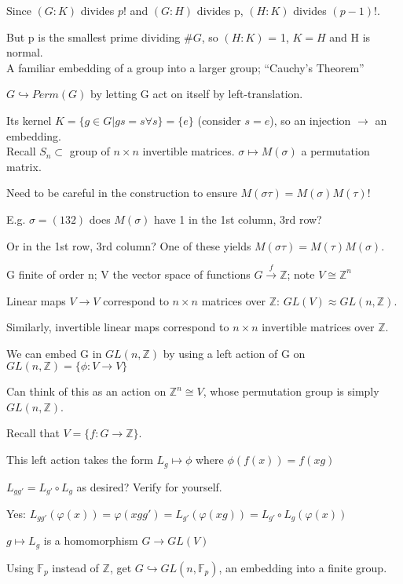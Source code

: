 \documentclass[12pt]{article}
\begin{document}
Since $(G : K)$ divides $p!$ and $(G : H)$ divides p, $(H : K)$ divides $(p - 1)!$.

But p is the smallest prime dividing $\#G$, so $(H : K)$ = 1, $K = H$ and H is normal.\\

\noindent
A familiar embedding of a group into a larger group; ``Cauchy's Theorem''

$G \hookrightarrow Perm(G)$ by letting G act on itself by left-translation.

Its kernel $K = \{g \in G | gs=s \forall s\} = \{e\}$ (consider $s = e$), so an injection $\to$ an embedding.\\

\noindent
Recall $S_n \subset$ group of $n \times n$ invertible matrices. $\sigma \mapsto M(\sigma)$ a permutation matrix.

Need to be careful in the construction to ensure $M(\sigma\tau)=M(\sigma)M(\tau)$!

E.g. $\sigma = (1 3 2)$ does $M(\sigma)$ have 1 in the 1st column, 3rd row?

Or in the 1st row, 3rd column?  One of these yields $M(\sigma\tau) = M(\tau)M(\sigma)$.

\noindent
G finite of order n; V the vector space of functions $G \xrightarrow{f} \mathds{Z}$; note $V \cong \mathds{Z}^n$

Linear maps $V \to V$ correspond to $n \times n$ matrices over $\mathds{Z}$:  $GL(V) \approx GL(n, \mathds{Z})$.

Similarly, invertible linear maps correspond to $n \times n$ invertible matrices over $\mathds{Z}$.

We can embed G in $GL(n, \mathds{Z})$ by using a left action of G on $GL(n, \mathds{Z}) = \{\phi: V \to V\}$

Can think of this as an action on $\mathds{Z}^n \cong V$, whose permutation group is simply $GL(n, \mathds{Z})$.

Recall that $V = \{f : G \to \mathds{Z}\}$.

This left action takes the form $L_g \mapsto \phi$ where $\phi(f(x)) = f(xg)$

$L_{gg'} = L_{g'} \circ L_{g}$ as desired? Verify for yourself.

Yes: $L_{gg'}(\varphi (x)) = \varphi(xgg') = L_{g'}(\varphi (xg)) = L_{g'} \circ L_g (\varphi(x))$

$g \mapsto L_g$ is a homomorphism $G \to GL(V)$

Using $\mathds{F}_p$ instead of $\mathds{Z}$, get $G \hookrightarrow GL(n, \mathds{F}_p)$, an embedding into a finite group.
\end{document}

